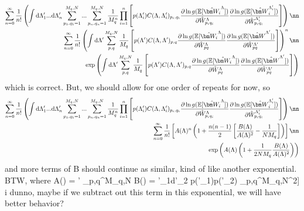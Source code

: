 \begin{align}
\sum_{n=0}^\infty \frac{1}{n!}\left(\int {\rm d}\Lambda_1'...{\rm d}\Lambda_n' \sum_{p_1,q_1=1}^{M_q,N}...\sum_{p_n,q_n=1}^{M_q,N}\frac{1}{M_q^n}\prod_{i=1}^n \left[p(\Lambda'_i) C(\Lambda, \Lambda'_i)_{p_i,q_i} \frac{\partial \ln g(\mathbb{E}[\hat{\bm W_i}^{\Lambda}])}{\partial \hat{W}^\Lambda_{p_iq_i}}\frac{\partial \ln g(\mathbb{E}[\hat{\bm W}_i^{\Lambda'_i}])}{\partial \hat{W}^{\Lambda'_i}_{p_iq_i}}\right]\right) \nn \\
\sum_{n=0}^\infty \frac{1}{n!} \left( \int {\rm d}\Lambda' \sum_{p,q}^{M_q,N}\frac{1}{M_q}\left[p(\Lambda') C(\Lambda, \Lambda')_{p,q} \frac{\partial \ln g(\mathbb{E}[\hat{\bm W_i}^{\Lambda}])}{\partial \hat{W}^\Lambda_{pq}}\frac{\partial \ln g(\mathbb{E}[\hat{\bm W}^{\Lambda'}])}{\partial \hat{W}^{\Lambda'}_{pq}}\right]\right)^n \nn \\
\exp\left( \int {\rm d}\Lambda' \sum_{p,q}^{M_q,N}\frac{1}{M_q}\left[p(\Lambda') C(\Lambda, \Lambda')_{p,q} \frac{\partial \ln g(\mathbb{E}[\hat{\bm W_i}^{\Lambda}])}{\partial \hat{W}^\Lambda_{pq}}\frac{\partial \ln g(\mathbb{E}[\hat{\bm W}^{\Lambda'}])}{\partial \hat{W}^{\Lambda'}_{pq}}\right]\right)
\end{align}
which is correct. But, we should allow for one order of repeats for now, so
\begin{align}
\sum_{n=0}^\infty \frac{1}{n!}\left(\int {\rm d}\Lambda_1'...{\rm d}\Lambda_n' \sum_{p_1,q_1=1}^{M_q,N}...\sum_{p_n,q_n=1}^{M_q,N}\frac{1}{M_q^n}\prod_{i=1}^n \left[p(\Lambda'_i) C(\Lambda, \Lambda'_i)_{p_i,q_i} \frac{\partial \ln g(\mathbb{E}[\hat{\bm W_i}^{\Lambda}])}{\partial \hat{W}^\Lambda_{p_iq_i}}\frac{\partial \ln g(\mathbb{E}[\hat{\bm W}_i^{\Lambda'_i}])}{\partial \hat{W}^{\Lambda'_i}_{p_iq_i}}\right]\right) \nn \\
\sum_{n=0}^\infty \frac{1}{n!} \left[ A(\Lambda)^n\left(1 + \frac{n(n-1)}{2}\left[\frac{B(\Lambda)}{A(\Lambda)^2} - \frac{1}{NM_q}\right]\right)\right] \nn \\
\exp\left( A(\Lambda)\left(1 + \frac{1}{2NM_q}\frac{B(\Lambda)}{A(\Lambda)^2}\right)\right)
\end{align}
and more terms of B should continue as similar, kind of like another exponential. BTW,
where
\beq
A(\Lambda) = \Lambda' \sum_{p,q}^{M_q,N}
\eeq
\beq
B(\Lambda) = \Lambda'_1{\rm d}\Lambda'_2 p(\Lambda'_1)p(\Lambda'_2) \sum_{p,q}^{M_q,N}\left[ C(\Lambda, \Lambda, \Lambda'_1, \Lambda'_2)_{p,q} \left[\frac{\partial \ln g(\mathbb{E}[\hat{\bm W_i}^{\Lambda}])}{\partial \hat{W}^\Lambda_{pq}}\right]^2\right]
\eeq
i dunno, maybe if we subtract out this term in this exponential, we will have better behavior? 
